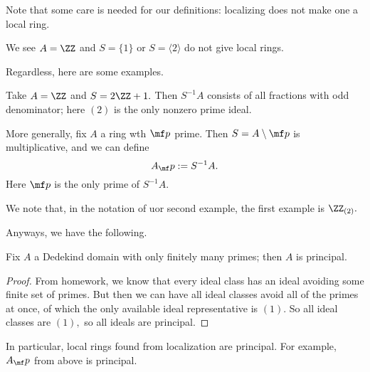 Note that some care is needed for our definitions: localizing does not make one a local ring. 
\begin{nex}
    We see $A=\ZZ$ and $S=\{1\}$ or $S=\langle2\rangle$ do not give local rings.
\end{nex}
Regardless, here are some examples.
\begin{example}
    Take $A=\ZZ$ and $S=2\ZZ+1.$ Then $S^{-1}A$ consists of all fractions with odd denominator; here $(2)$ is the only nonzero prime ideal.
\end{example}
\begin{example}
    More generally, fix $A$ a ring wth $\mf p$ prime. Then $S=A\setminus\mf p$ is multiplicative, and we can define
    \[A_\mf p:=S^{-1}A.\]
    Here $\mf p$ is the only prime of $S^{-1}A.$
\end{example}
We note that, in the notation of uor second example, the first example is $\ZZ_{(2)}.$

Anyways, we have the following.
\begin{proposition}
    Fix $A$ a Dedekind domain with only finitely many primes; then $A$ is principal.
\end{proposition}
\begin{proof}
    From homework, we know that every ideal class has an ideal avoiding some finite set of primes. But then we can have all ideal classes avoid all of the primes at once, of which the only available ideal representative is $(1).$ So all ideal classes are $(1),$ so all ideals are principal.
\end{proof}
In particular, local rings found from localization are principal. For example, $A_\mf p$ from above is principal.


